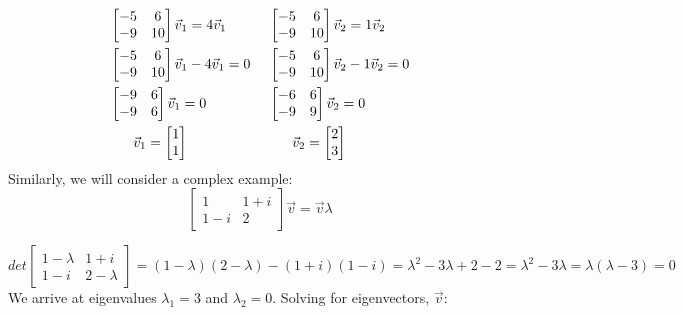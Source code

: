 \documentclass{article}
\theoremstyle{plain}
\begin{document}
\begin{align*}
&\begin{bmatrix}-5 & 6\\-9 & 10\end{bmatrix}\vec{v}_1             = 4 \vec{v}_1 & \hspace{1mm} &\begin{bmatrix}-5 & 6\\-9 & 10\end{bmatrix} \vec{v}_2            = 1\vec{v}_2 \\
&\begin{bmatrix}-5 & 6\\-9 & 10\end{bmatrix}\vec{v}_1-4 \vec{v}_1 = 0           & \hspace{1mm} &\begin{bmatrix}-5 & 6\\-9 & 10\end{bmatrix} \vec{v}_2-1\vec{v}_2 = 0 \\
&\begin{bmatrix}-9 & 6\\-9 & 6\end{bmatrix}\vec{v}_1              = 0           & \hspace{1mm} &\begin{bmatrix}-6 & 6\\-9 & 9\end{bmatrix} \vec{v}_2 = 0 \\
& \hspace{6mm} \vec{v}_1            =\begin{bmatrix}1\\1\end{bmatrix}           & \hspace{1mm} &\hspace{6mm} \vec{v}_2    =\begin{bmatrix}2\\3\end{bmatrix} 
\end{align*}
Similarly, we will consider a complex example:
$$\begin{bmatrix}1 & 1+i\\1-i & 2\end{bmatrix}\vec{v}=\vec{v}\lambda$$

$$det\begin{bmatrix}1-\lambda & 1+i\\1-i & 2-\lambda\end{bmatrix}=(1-\lambda)(2-\lambda)-(1+i)(1-i)=\lambda^2-3\lambda+2-2=\lambda^2-3\lambda=\lambda(\lambda-3)=0$$
We arrive at eigenvalues $\lambda_1 = 3$ and $\lambda_2=0$. Solving for eigenvectors, $\vec{v}$:
\end{document}
